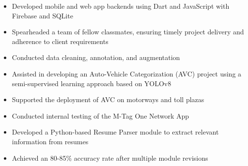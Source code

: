 \documentclass[10pt,a4paper,ragged2e,withhyper]{altacv}
\begin{document}


\makecvheader


\begin{paracol}{2}



\begin{itemize}
\item Developed mobile and web app backends using Dart and JavaScript with Firebase and SQLite
\item Spearheaded a team of fellow classmates, ensuring timely project delivery and adherence to client requirements
\end{itemize}

\divider


\begin{itemize}
\item Conducted data cleaning, annotation, and augmentation
\item Assisted in developing an Auto-Vehicle Categorization (AVC) project using a semi-supervised learning approach based on YOLOv8
\item Supported the deployment of AVC on motorways and toll plazas
\item Conducted internal testing of the M-Tag One Network App
\end{itemize}

\divider


\begin{itemize}
\item Developed a Python-based Resume Parser module to extract relevant information from resumes
\item Achieved an 80-85\% accuracy rate after multiple module revisions
\end{itemize}

\divider



\end{paracol}
\end{document}
